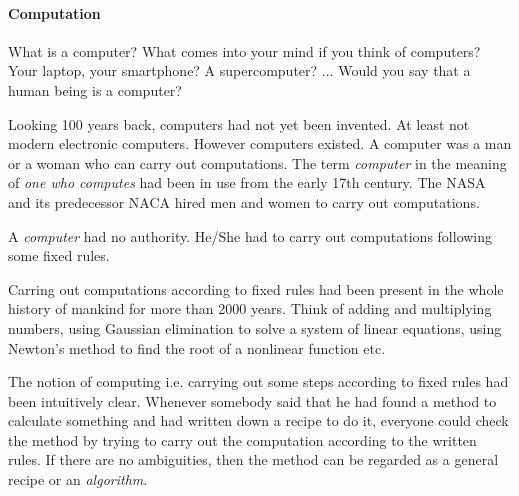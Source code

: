 \begin{comment}
        Polymorphic types (System F): Adding List X, Array X, Pair X Y. Type
        functions mapping types to types.

        Polymorphic functions (System Fω): reverse List X. Functions mapping
        types and objects to objects.

        Dependent types for logic: Expressing type ∀x. P x. An object of this
        type is a function which maps an object x to a proof of P x.
        Computational objects appearing in types.

    Calculus of constructions: Expressive in terms of functions it can express
    and in terms of logical statements it can express. Sweet spot in the desigs
    space of typed lambda calculi.
\end{comment}




\paragraph{Computation}
What is a computer? What comes into your mind if you think of computers? Your
laptop, your smartphone? A supercomputer? ... Would you say that a human being
is a computer?

Looking 100 years back, computers had not yet been invented. At least not modern
electronic computers. However computers existed. A computer was a man or a woman
who can carry out computations. The term \emph{computer} in the meaning of
\emph{one who computes} had been in use from the early 17th century. The NASA
and its predecessor NACA hired men and women to carry out computations.

A \emph{computer} had no authority. He/She had to carry out computations
following some fixed rules.

Carring out computations according to fixed rules had been present in the whole
history of mankind for more than 2000 years. Think of adding and multiplying
numbers, using Gaussian elimination to solve a system of linear equations, using
Newton's method to find the root of a nonlinear function etc.

The notion of computing i.e. carrying out some steps according to fixed rules
had been intuitively clear. Whenever somebody said that he had found a method to
calculate something and had written down a recipe to do it, everyone could check
the method by trying to carry out the computation according to the written
rules. If there are no ambiguities, then the method can be regarded as a general
recipe or an \emph{algorithm}.



